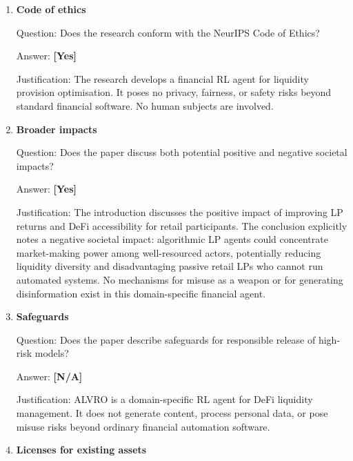 \documentclass{article}
\begin{document}
\begin{enumerate}
Question: Does the paper provide sufficient information on the compute resources needed to reproduce the experiments?

Answer: \textbf{[Yes]}

Justification: Training uses a standard MacBook CPU (Apple M-series) for 1M timesteps, taking approximately 42 minutes for the rule-based sentinel ($\approx$400 steps/sec). The LLM sentinel requires an internet connection and a DeepSeek API key; throughput is API-bound at approximately 10 steps/sec, yielding a training time of approximately 26 hours for 1M steps.

\item \textbf{Code of ethics}

Question: Does the research conform with the NeurIPS Code of Ethics?

Answer: \textbf{[Yes]}

Justification: The research develops a financial RL agent for liquidity provision optimisation. It poses no privacy, fairness, or safety risks beyond standard financial software. No human subjects are involved.

\item \textbf{Broader impacts}

Question: Does the paper discuss both potential positive and negative societal impacts?

Answer: \textbf{[Yes]}

Justification: The introduction discusses the positive impact of improving LP returns and DeFi accessibility for retail participants. The conclusion explicitly notes a negative societal impact: algorithmic LP agents could concentrate market-making power among well-resourced actors, potentially reducing liquidity diversity and disadvantaging passive retail LPs who cannot run automated systems. No mechanisms for misuse as a weapon or for generating disinformation exist in this domain-specific financial agent.

\item \textbf{Safeguards}

Question: Does the paper describe safeguards for responsible release of high-risk models?

Answer: \textbf{[N/A]}

Justification: ALVRO is a domain-specific RL agent for DeFi liquidity management. It does not generate content, process personal data, or pose misuse risks beyond ordinary financial automation software.

\item \textbf{Licenses for existing assets}


\end{enumerate}
\end{document}
